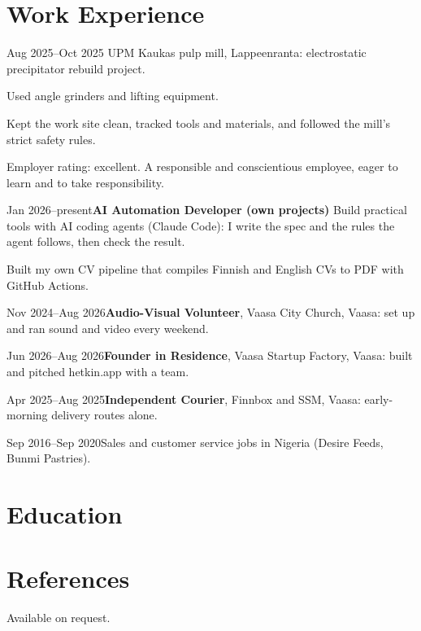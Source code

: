 \documentclass[a4paper,11pt]{article}
\begin{document}
\section{Work Experience}
\begin{cventry}{Aug 2025--Oct 2025}{}
  UPM Kaukas pulp mill, Lappeenranta: electrostatic precipitator rebuild project.\par
  Used angle grinders and lifting equipment.\par
  Kept the work site clean, tracked tools and materials, and followed the mill's strict safety rules.\par
  Employer rating: excellent. A responsible and conscientious employee, eager to learn and to take responsibility.
\end{cventry}
\begin{cventry}{Jan 2026--present}{\textbf{AI Automation Developer (own projects)}}
  Build practical tools with AI coding agents (Claude Code): I write the spec and the rules the agent follows, then check the result.\par
  Built my own CV pipeline that compiles Finnish and English CVs to PDF with GitHub Actions.
\end{cventry}
\begin{cventry}{Nov 2024--Aug 2026}{\textbf{Audio-Visual Volunteer}, Vaasa City Church, Vaasa: set up and ran sound and video every weekend.}
\end{cventry}
\begin{cventry}{Jun 2026--Aug 2026}{\textbf{Founder in Residence}, Vaasa Startup Factory, Vaasa: built and pitched hetkin.app with a team.}
\end{cventry}
\begin{cventry}{Apr 2025--Aug 2025}{\textbf{Independent Courier}, Finnbox and SSM, Vaasa: early-morning delivery routes alone.}
\end{cventry}
\begin{cventry}{Sep 2016--Sep 2020}{Sales and customer service jobs in Nigeria (Desire Feeds, Bunmi Pastries).}
\end{cventry}

\section{Education}

\section{References}
Available on request.
\end{document}
